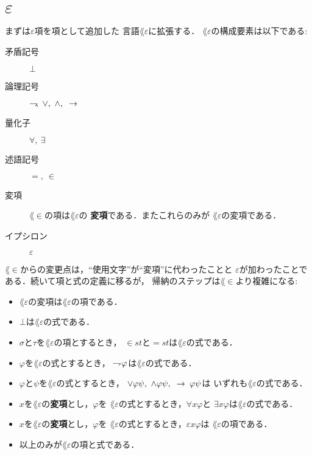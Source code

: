 \section{$\varepsilon$}
	まずは$\varepsilon$項を項として追加した
	言語$\lang{\varepsilon}$に拡張する．
	$\lang{\varepsilon}$の構成要素は以下である:
	
	\begin{description}
		\item[矛盾記号] $\bot$
		\item[論理記号] $\negation,\ \vee,\ \wedge,\ \rarrow$
		\item[量化子] $\forall,\ \exists$
		\item[述語記号] $=,\ \in$
		\item[変項] $\lang{\in}$の項は$\lang{\varepsilon}$の
			{\bf 変項}である．またこれらのみが
			$\lang{\varepsilon}$の変項である．
		\item[イプシロン] $\varepsilon$
	\end{description}
	
	$\lang{\in}$からの変更点は，``使用文字''が``変項''に代わったことと
	$\varepsilon$が加わったことである．続いて項と式の定義に移るが，
	帰納のステップは$\lang{\in}$より複雑になる:
	
	\begin{itemize}
		\item $\lang{\varepsilon}$の変項は$\lang{\varepsilon}$の項である．
		\item $\bot$は$\lang{\varepsilon}$の式である．
		\item $\sigma$と$\tau$を$\lang{\varepsilon}$の項とするとき，
			$\in st$と$=st$は$\lang{\varepsilon}$の式である．
		\item $\varphi$を$\lang{\varepsilon}$の式とするとき，
			$\rightharpoondown\hspace{-0.25em} \varphi$は$\lang{\varepsilon}$の式である．
		\item $\varphi$と$\psi$を$\lang{\varepsilon}$の式とするとき，
			$\vee \varphi \psi,\ \wedge \varphi \psi,\ \rarrow \varphi \psi$は
			いずれも$\lang{\varepsilon}$の式である．
		\item $x$を$\lang{\varepsilon}$の{\bf 変項}とし，$\varphi$を
			$\lang{\varepsilon}$の式とするとき，$\forall x \varphi$と
			$\exists x \varphi$は$\lang{\varepsilon}$の式である．
		\item $x$を$\lang{\varepsilon}$の{\bf 変項}とし，$\varphi$を
			$\lang{\varepsilon}$の式とするとき，$\varepsilon x \varphi$は
			$\lang{\varepsilon}$の項である．
		\item 以上のみが$\lang{\varepsilon}$の項と式である．
	\end{itemize}
	
